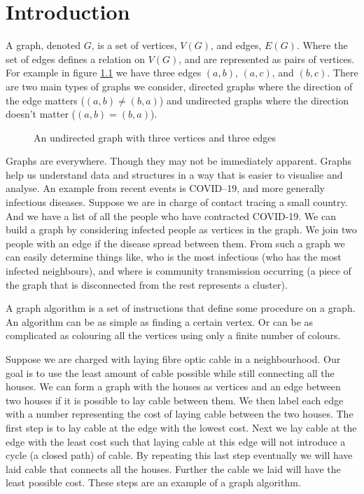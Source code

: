 \chapter{Introduction}\label{chpt:into}
A graph, denoted $G$, is a set of vertices, $V(G)$, and edges, $E(G)$. Where the set of edges defines a relation on $V(G)$, and are represented as pairs of vertices. For example in figure \ref{fig:k3} we have three edges $(a,b)$, $(a,c)$, and $(b,c)$. There are two main types of graphs we consider, directed graphs where the direction of the edge matters ($(a,b)\neq (b,a)$) and undirected graphs where the direction doesn't matter ($(a,b)=(b,a)$). 

\begin{figure}[h]
    \centering
{}
    \caption{An undirected graph with three vertices and three edges}
\label{fig:k3}
\end{figure}
   
Graphs are everywhere. Though they may not be immediately apparent. 
Graphs help us understand data and structures in a way that is easier to visualise and analyse. An example from recent events is COVID--19, and more generally infectious diseases.  Suppose we are in charge of contact tracing a small country. And we have a list of all the people who have contracted COVID-19. We can build a graph by considering infected people as vertices in the graph. We join two people with an edge if the disease spread between them. %
From such a graph we can easily determine things like, who is the most infectious (who has the most infected neighbours), and where is community transmission occurring (a piece of the graph that is disconnected from the rest represents a cluster).
     
A graph algorithm is a set of instructions that define some procedure on a graph. An algorithm can be as simple as finding a certain vertex. Or can be as complicated as colouring all the vertices using only a finite number of colours.  

Suppose we are charged with laying fibre optic cable in a neighbourhood. Our goal is to use the least amount of cable possible while still connecting all the houses. We can form a graph with the houses as vertices and an edge between two houses if it is possible to lay cable between them. We then label each edge with a number representing the cost of laying cable between the two houses. The first step is to lay cable at the edge with the lowest cost. Next we lay cable at the edge with the least cost such that laying cable at this edge will not introduce a cycle (a closed path) of cable. By repeating this last step eventually we will have laid cable that connects all the houses. Further the cable we laid will have the least possible cost. These steps are an example of a graph algorithm.
   
